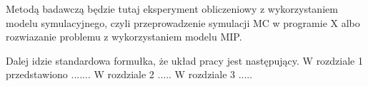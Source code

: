 Metodą badawczą będzie tutaj eksperyment obliczeniowy z wykorzystaniem modelu symulacyjnego, czyli przeprowadzenie symulacji MC w programie X albo rozwiazanie problemu z wykorzystaniem modelu MIP.

Dalej idzie standardowa formułka, że układ pracy jest następujący. W rozdziale 1 przedstawiono ....... W rozdziale 2 ..... W rozdziale 3 .....

